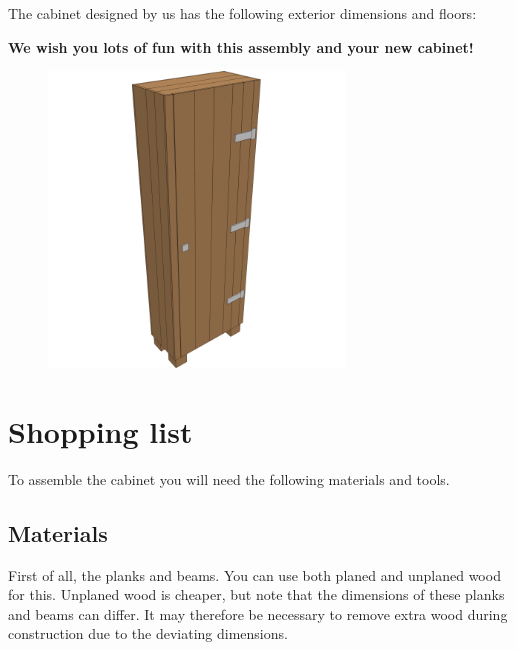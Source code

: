 \documentclass{article}
\begin{document}
The cabinet designed by us has the following exterior dimensions and floors: \\

 

\begin{center}
\textbf{We wish you lots of fun with this assembly and your new cabinet!}
\end{center}

\begin{figure}[h!]
    \centering
    \includegraphics[width=0.7\textwidth]{scene 12 - compleet.png}
\end{figure}

\clearpage
\newpage

\section{Shopping list}

To assemble the cabinet you will need the following materials and tools. \\

\subsection{Materials}

First of all, the planks and beams. You can use both planed and unplaned wood for this. Unplaned wood is cheaper, but note that the dimensions of these planks and beams can differ. It may therefore be necessary to remove extra wood during construction due to the deviating dimensions.


\end{document}

